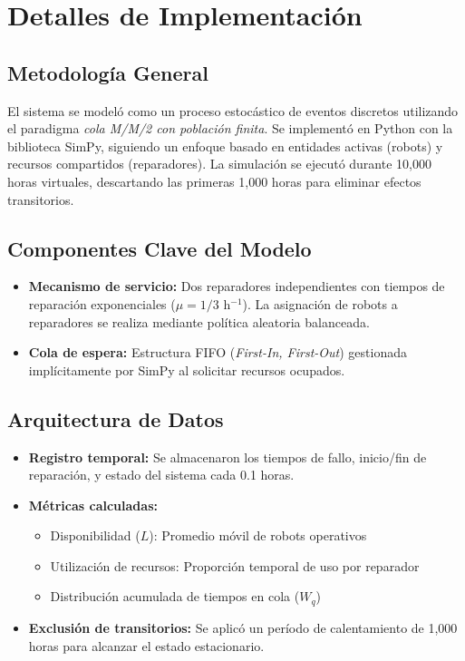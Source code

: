 \documentclass[12pt, a4paper]{article}
\begin{document}
\section{Detalles de Implementación}

\subsection{Metodología General}
El sistema se modeló como un proceso estocástico de eventos discretos utilizando el paradigma \textit{cola M/M/2 con población finita}. Se implementó en Python con la biblioteca SimPy, siguiendo un enfoque basado en entidades activas (robots) y recursos compartidos (reparadores). La simulación se ejecutó durante 10,000 horas virtuales, descartando las primeras 1,000 horas para eliminar efectos transitorios.

\subsection{Componentes Clave del Modelo}
\begin{itemize}
    \item \textbf{Mecanismo de servicio:} Dos reparadores independientes con tiempos de reparación exponenciales ($\mu = 1/3$ h$^{-1}$). La asignación de robots a reparadores se realiza mediante política aleatoria balanceada.
    
    \item \textbf{Cola de espera:} Estructura FIFO (\textit{First-In, First-Out}) gestionada implícitamente por SimPy al solicitar recursos ocupados.
\end{itemize}

\subsection{Arquitectura de Datos}
\begin{itemize}
    \item \textbf{Registro temporal:} Se almacenaron los tiempos de fallo, inicio/fin de reparación, y estado del sistema cada 0.1 horas.
    
    \item \textbf{Métricas calculadas:} 
    \begin{itemize}
        \item Disponibilidad ($L$): Promedio móvil de robots operativos
        \item Utilización de recursos: Proporción temporal de uso por reparador
        \item Distribución acumulada de tiempos en cola ($W_q$)
    \end{itemize}
    \item \textbf{Exclusión de transitorios:} Se aplicó un período de calentamiento de 1,000 horas para alcanzar el estado estacionario.
\end{itemize}
\end{document}
